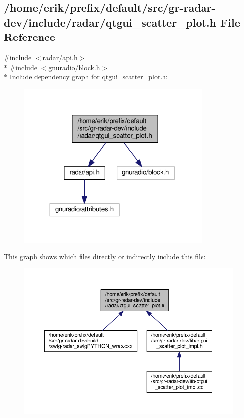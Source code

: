 \subsection{/home/erik/prefix/default/src/gr-\/radar-\/dev/include/radar/qtgui\+\_\+scatter\+\_\+plot.h File Reference}
\label{qtgui__scatter__plot_8h}
{\ttfamily \#include $<$radar/api.\+h$>$}\\*
{\ttfamily \#include $<$gnuradio/block.\+h$>$}\\*
Include dependency graph for qtgui\+\_\+scatter\+\_\+plot.\+h\+:
\nopagebreak
\begin{figure}[H]
\begin{center}
\leavevmode
\includegraphics[width=270pt]{d6/d30/qtgui__scatter__plot_8h__incl}
\end{center}
\end{figure}
This graph shows which files directly or indirectly include this file\+:
\nopagebreak
\begin{figure}[H]
\begin{center}
\leavevmode
\includegraphics[width=350pt]{df/dec/qtgui__scatter__plot_8h__dep__incl}
\end{center}
\end{figure}
